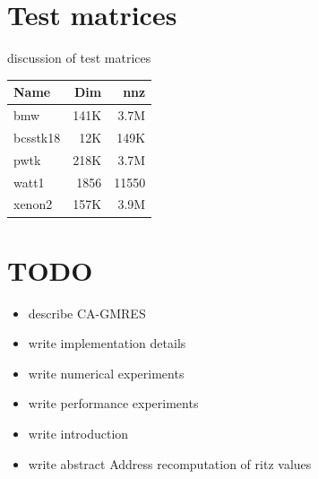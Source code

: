 \documentclass{scrartcl}
\numberwithin{equation}{section}
\begin{document}
\begin{appendices}
\section{Test matrices}
discussion of test matrices \\

\begin{tabular}{l|r|r}
Name & Dim & nnz \\
\hline
bmw & 141K & 3.7M \\
bcsstk18 & 12K & 149K \\
pwtk & 218K & 3.7M \\
watt1 & 1856 & 11550 \\
xenon2 & 157K & 3.9M
\end{tabular}

\section{TODO}
\begin{itemize}
\item describe CA-GMRES
\item write implementation details
\item write numerical experiments
\item write performance experiments
\item write introduction
\item write abstract
Address recomputation of ritz values
\end{itemize}
\end{appendices}
\end{document}
